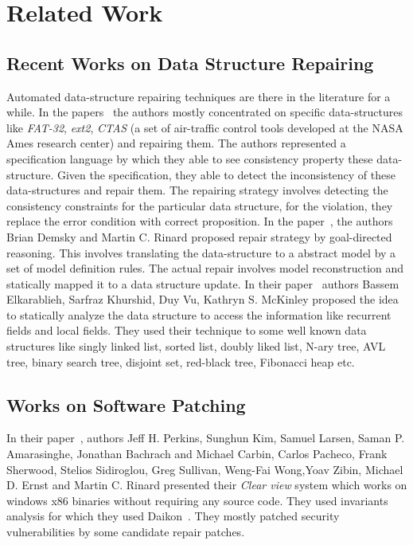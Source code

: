 

\section{Related Work}
\label{sec:relatedWorks}

\subsection{Recent Works on Data Structure Repairing}
\label{subsec:RecWorksDataStructure}

Automated data-structure repairing techniques are there in the literature for a
while. In the papers~\cite{conf/oopsla/DemskyR03, Demsky03automaticdata,
conf/icse/DemskyR05, conf/issre/DemskyR03, conf/issta/DemskyEGMPR06} the authors
mostly concentrated on specific data-structures like \emph{FAT-32}, \emph{ext2},
\emph{CTAS} (a set of air-traffic control tools developed at the NASA Ames
research center) and repairing them. The authors represented a specification
language by which they able to see consistency property these data-structure.
Given the specification, they able to detect the inconsistency of these
data-structures and repair them.
The repairing strategy involves detecting the consistency constraints for the
particular data structure, for the violation, they replace the error condition
with correct proposition. In the paper~\cite{conf/icse/DemskyR05}, the authors
Brian Demsky and Martin C. Rinard proposed repair strategy by goal-directed
reasoning. This involves translating the data-structure to a abstract model by a
set of model definition rules. The actual repair involves model reconstruction
and statically mapped it to a data structure update. In their
paper~\cite{conf/oopsla/2007} authors Bassem Elkarablieh, Sarfraz Khurshid, Duy
Vu, Kathryn S. McKinley proposed the idea to statically analyze the data
structure to access the information like recurrent fields and local fields. They
used their technique to some well known data structures like singly linked list,
sorted list, doubly liked list, N-ary tree, AVL tree, binary search tree,
disjoint set, red-black tree, Fibonacci heap etc.

\subsection{Works on Software Patching}
\label{subsec:RecWorksSoftPatch}

In their paper~\cite{conf/sosp/PerkinsKLABCPSSSWZER09}, authors Jeff H.
Perkins, Sunghun Kim, Samuel Larsen, Saman P. Amarasinghe, Jonathan Bachrach and
Michael Carbin, Carlos Pacheco, Frank Sherwood, Stelios Sidiroglou, Greg
Sullivan, Weng-Fai Wong,Yoav Zibin, Michael D. Ernst and Martin C. Rinard
presented their \emph{Clear view} system which works on windows x86 binaries
without requiring any source code. They used invariants analysis for which they
used Daikon~\cite{journals/scp/ErnstPGMPTX07}. They mostly patched security
vulnerabilities by some candidate repair patches.

